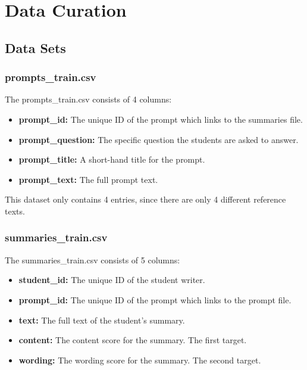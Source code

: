 
\chapter{Data Curation}
\label{ch:data}


\section{Data Sets}

\subsection{prompts\_train.csv}

The prompts\_train.csv consists of 4 columns:

\begin{itemize}
	\item \textbf{prompt\_id:} The unique ID of the prompt which links to the summaries file.
	\item \textbf{prompt\_question:} The specific question the students are asked to answer.%
	\item \textbf{prompt\_title:} A short-hand title for the prompt.
	\item \textbf{prompt\_text:} The full prompt text.
\end{itemize}

This dataset only contains 4 entries, since there are only 4 different reference texts.

\subsection{summaries\_train.csv}

The summaries\_train.csv consists of 5 columns:

\begin{itemize}
	\item \textbf{student\_id:} The unique ID of the student writer.
	\item \textbf{prompt\_id:} The unique ID of the prompt which links to the prompt file. 
	\item \textbf{text:} The full text of the student's summary.
	\item \textbf{content:} The content score for the summary. The first target.
	\item \textbf{wording:} The wording score for the summary. The second target.

\end{itemize}

